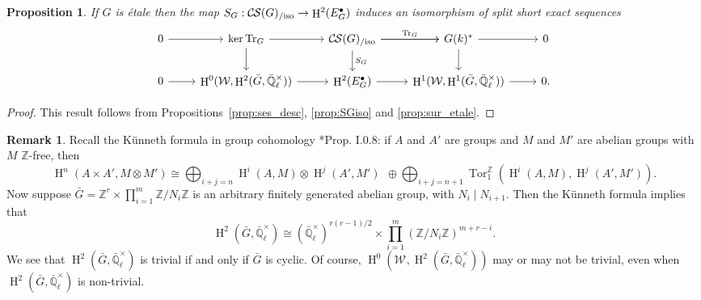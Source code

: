 \documentclass[10pt]{amsart}
\theoremstyle{plain}
\newtheorem{proposition}[theorem]{Proposition}
\theoremstyle{definition}
\newtheorem{remark}[theorem]{Remark}
\newcommand{\ZZ}{{\mathbb{Z}}}
\newcommand{\EE}{\mathbb{\bar Q}_\ell}
\newcommand{\Fq}{k}
\newcommand{\EEx}{\EE^\times}
\newcommand{\Weil}[1]{\mathcal{W}_{#1}}
\DeclareMathOperator{\Hh}{H}
\DeclareMathOperator{\Tor}{Tor}
\newcommand{\TrFrob}[1]{\operatorname{Tr}_{#1}}
\newcommand{\CS}{{\mathcal{C\hskip-0.8pt S}}}
\newcommand{\CSiso}[1]{\CS(#1)_{/\text{iso}}}
\newcommand{\bG}{\bar{G}}
\begin{document}
\begin{proposition} \label{prop:etale-iso}
 If $G$ is \'etale then the map $S_G : \CSiso{G}\to \Hh^2(E^\bullet_G)$ induces an isomorphism of split short exact sequences
\[
\begin{tikzcd}
 0 \arrow{r} & \ker \TrFrob{G} \arrow{d} \arrow{r} & \CSiso{G}\arrow{d}{S_G} \arrow{r}{\TrFrob{G}} \arrow{r} & G(\Fq)^* \arrow{d} \arrow{r} & 0\\
  0 \arrow{r} & \Hh^0(\Weil{},\Hh^2(\bG,\EEx)) \arrow{r} & \Hh^2(E^\bullet_G) \arrow{r} & \Hh^1(\Weil{},\Hh^1(\bG,\EEx)) \arrow{r} & 0.
 \end{tikzcd}
 \]
\end{proposition}
\begin{proof}
This result follows from Propositions~\ref{prop:ses_desc}, \ref{prop:SGiso} and \ref{prop:sur_etale}.
\end{proof}

\begin{remark} \label{rem:H2}
Recall the K\"unneth formula in group cohomology \cite{brown:CohomologyOfGroups}*{Prop. I.0.8}:
if $A$ and $A'$ are groups and $M$ and $M'$ are abelian groups with $M$ $\ZZ$-free, then
\[
\Hh^n(A \times A', M \otimes M') \cong \bigoplus_{i+j=n} \Hh^i(A, M) \otimes \Hh^j(A', M') \ \ \oplus
\bigoplus_{i+j=n+1} \Tor_1^{\ZZ}\left(\Hh^i(A, M), \Hh^j(A', M')\right).
\]
%
Now suppose $\bG = \ZZ^r \times \prod_{i = 1}^m \ZZ/N_i\ZZ$ is an arbitrary finitely generated abelian group,
with $N_i \mid N_{i+1}$.  Then the K\"unneth formula implies that
\begin{equation} \label{eq:H2comp}
\Hh^2(\bG, \EEx) \cong \left(\EEx\right)^{r(r-1)/2} \times \prod_{i=1}^m (\ZZ/N_i\ZZ)^{m+r-i}.
\end{equation}
We see that $\Hh^2(\bG, \EEx)$ is trivial if and only if $\bG$ is cyclic.  Of course, $\Hh^0(\Weil{}, \Hh^2(\bG, \EEx))$
may or may not be trivial, even when $\Hh^2(\bG, \EEx)$ is non-trivial.
\end{remark}
\end{document}
